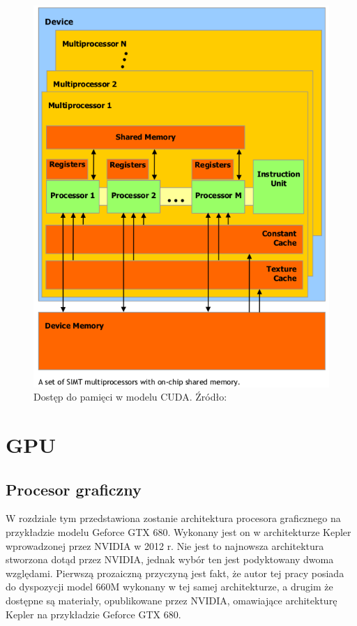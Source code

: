 \begin{figure}[H]
\centering
\label{hier2}
\includegraphics[scale=0.6]{images/gpu.png}
\caption{Dostęp do pamięci w modelu CUDA. Źródło: \cite{Nvi11b}}
\end{figure}

\section{GPU}
\subsection{Procesor graficzny}
W rozdziale tym przedstawiona zostanie architektura procesora graficznego na
przykładzie modelu Geforce GTX 680. Wykonany jest on w architekturze Kepler
wprowadzonej przez NVIDIA w 2012 r. Nie jest to najnowsza architektura stworzona
dotąd przez NVIDIA, jednak wybór ten jest podyktowany dwoma
względami. Pierwszą prozaiczną przyczyną jest fakt, że autor tej pracy posiada
do dyspozycji model 660M wykonany w tej samej architekturze, a drugim że
dostępne są materiały, opublikowane przez NVIDIA, omawiające architekturę Kepler
na przykładzie Geforce GTX 680.

